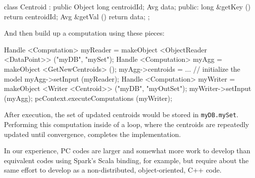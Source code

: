 \begin{code}
class Centroid : public Object {
	long centroidId; 
	Avg data;
public:
	long &getKey () {return centroidId;}
	Avg &getVal () {return data;}
};
\end{code}

\noindent
And then build up a computation using these pieces:

\begin{code}
Handle <Computation> myReader = makeObject <ObjectReader <DataPoint>> ("myDB", "mySet");
Handle <Computation> myAgg = makeObject <GetNewCentroids> ();
myAgg->centroids = ... // initialize the model
myAgg->setInput (myReader);
Handle <Computation> myWriter =  makeObject <Writer <Centroid>> ("myDB", "myOutSet");
myWriter->setInput (myAgg);
pcContext.executeComputations (myWriter);
\end{code}

\noindent After execution, the set of updated centroids would be stored in \texttt{myDB.mySet}.
Performing this computation inside of a loop, where the centroids are repeatedly updated until convergence, completes the implementation.

In our experience, PC codes are larger and somewhat more work to develop than equivalent codes using Spark's Scala binding, for
example, but require about the same effort to develop as a non-distributed, object-oriented, C++ code.

